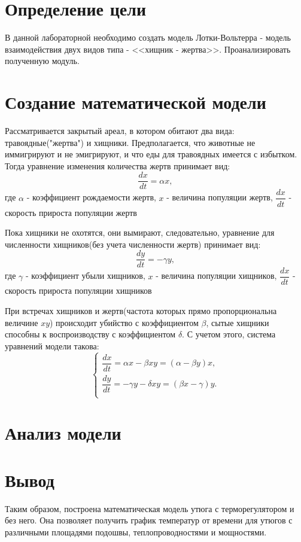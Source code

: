 \documentclass[a4paper, 14pt]{extarticle}
\begin{document}
	\pagebreak	

	\section{Определение цели}
		В данной лабораторной необходимо создать модель Лотки-Вольтерра - модель взаимодействия двух видов типа - <<хищник - жертва>>.
		Проанализировать полученную модуль.

	\section{Создание математической модели}
		Рассматривается закрытый ареал, в котором обитают два вида: травоядные("жертва") и хищники. Предполагается, что животные не иммигрируют и не эмигрируют, и
		что еды для травоядных имеется с избытком. Тогда уравнение изменения количества жертв принимает вид:
			\[ \dfrac{dx}{dt} = \alpha x,\]
		где $\alpha$ - коэффициент рождаемости жертв, $x$ - величина популяции жертв, $\dfrac{dx}{dt}$ - скорость прироста популяции жертв

		Пока хищники не охотятся, они вымирают, следовательно, уравнение для численности хищников(без учета численности жертв) принимает вид:
			\[ \dfrac{dy}{dt} = -\gamma y,\]
		где $\gamma$ - коэффициент убыли хищников, $x$ - величина популяции хищников, $\dfrac{dx}{dt}$ - скорость прироста популяции хищников

		При встречах хищников и жертв(частота которых прямо пропорциональна величине $xy$) происходит убийство с коэффициентом $\beta$, сытые хищники способны к воспроизводству с коэффициентом $\delta$.
		С учетом этого, система уравнений модели такова:
		\[ \begin{cases}
			\dfrac{dx}{dt} = \alpha x - \beta xy = (\alpha - \beta y)x, \\
			\dfrac{dy}{dt} = - \gamma y - \delta xy = (\beta x - \gamma)y. \\
		    \end{cases}
		 \]
	
	\section{Анализ модели}

	\section{Вывод}
		Таким образом, построена математическая модель утюга с терморегулятором и без него. Она позволяет получить график температур от времени для утюгов с различными площадями подошвы, теплопроводностями и мощностями. 
		
\end{document}
